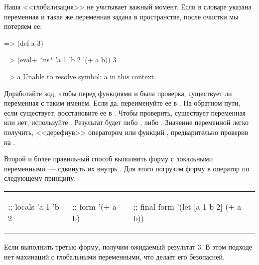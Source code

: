 Наша <<глобализация>> не учитывает важный момент. Если в словаре указана переменная  и такая же переменная задана в пространстве, после очистки мы потеряем ее:

\begin{english}
  \begin{clojure}
=> (def a 3)

=> (eval+ *ns* {'a 1 'b 2} '(+ a b))
3

=> a
Unable to resolve symbol: a in this context
  \end{clojure}
\end{english}

Доработайте код, чтобы перед функциями  и  была проверка, существует ли переменная с таким именем. Если да, переименуйте ее в . На обратном пути, если  существует, восстановите ее в . Чтобы проверить, существует переменная или нет, используйте . Результат будет либо , либо . Значение переменной легко получить, <<дерефнув>>  оператором  или функций , предварительно проверив на .

Второй и более правильный способ выполнить форму с локальными переменными~--- сдвинуть их внутрь . Для этого погрузим форму в оператор  по следующему принципу:

\begin{english}
\noindent
\begin{tabular}{ @{}p{3.5cm} @{}p{3cm} @{}p{3cm} }

  \begin{clojure}
;; locals
{'a 1 'b 2}
  \end{clojure}

&

  \begin{clojure}
;; form
'(+ a b)
  \end{clojure}

&

  \begin{clojure}
;; final form
'(let [a 1 b 2]
   (+ a b))
  \end{clojure}

\end{tabular}
\end{english}

Если выполнить третью форму, получим ожидаемый результат 3. В этом подходе нет махинаций с глобальными переменными, что делает его безопасней.

